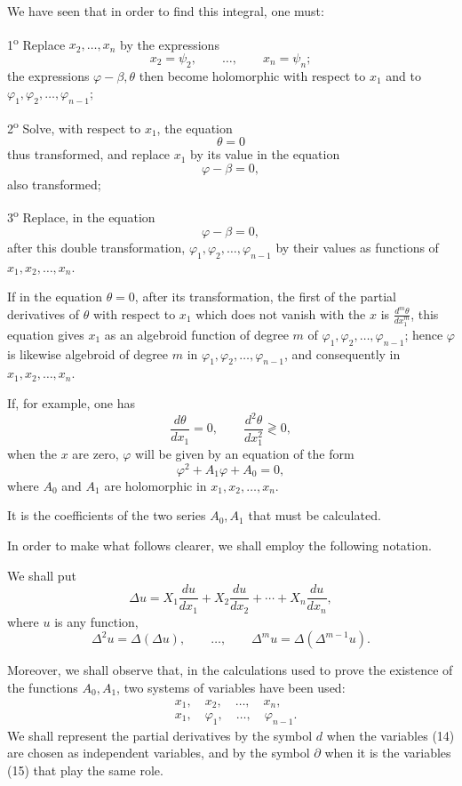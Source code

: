 \documentclass[11pt]{article}
\begin{document}
We have seen that in order to find this integral, one must:

1\textsuperscript{o} Replace $x_2,\ldots,x_n$ by the expressions
\begin{equation*}\tag{6}
x_2=\psi_2,\qquad \ldots,\qquad x_n=\psi_n;
\end{equation*}
the expressions $\varphi-\beta,\theta$ then become holomorphic with respect to $x_1$ and to $\varphi_1,\varphi_2,\ldots,\varphi_{n-1}$;

2\textsuperscript{o} Solve, with respect to $x_1$, the equation
\[
\theta=0
\]
thus transformed, and replace $x_1$ by its value in the equation
\[
\varphi-\beta=0,
\]
also transformed;

3\textsuperscript{o} Replace, in the equation
\[
\varphi-\beta=0,
\]
after this double transformation, $\varphi_1,\varphi_2,\ldots,\varphi_{n-1}$ by their values as functions of $x_1,x_2,\ldots,x_n$.

If in the equation $\theta=0$, after its transformation, the first of the partial derivatives of $\theta$ with respect to $x_1$ which does not vanish with the $x$ is $\frac{d^m\theta}{dx_1^m}$, this equation gives $x_1$ as an algebroid function of degree $m$ of $\varphi_1,\varphi_2,\ldots,\varphi_{n-1}$; hence $\varphi$ is likewise algebroid of degree $m$ in $\varphi_1,\varphi_2,\ldots,\varphi_{n-1}$, and consequently in $x_1,x_2,\ldots,x_n$.

If, for example, one has
\[
\frac{d\theta}{dx_1}=0,\qquad \frac{d^2\theta}{dx_1^2}\gtrless0,
\]
when the $x$ are zero, $\varphi$ will be given by an equation of the form
\[
\varphi^2+A_1\varphi+A_0=0,
\]
where $A_0$ and $A_1$ are holomorphic in $x_1,x_2,\ldots,x_n$.

It is the coefficients of the two series $A_0,A_1$ that must be calculated.

In order to make what follows clearer, we shall employ the following notation.

We shall put
\[
\Delta u=X_1\frac{du}{dx_1}+X_2\frac{du}{dx_2}+\cdots+X_n\frac{du}{dx_n},
\]
where $u$ is any function,
\[
\Delta^2u=\Delta(\Delta u),\qquad \ldots,\qquad \Delta^m u=\Delta(\Delta^{m-1}u).
\]

Moreover, we shall observe that, in the calculations used to prove the existence of the functions $A_0,A_1$, two systems of variables have been used:
\begin{align*}
\tag{14}
&x_1,\quad x_2,\quad \ldots,\quad x_n,\\
\tag{15}
&x_1,\quad \varphi_1,\quad \ldots,\quad \varphi_{n-1}.
\end{align*}
We shall represent the partial derivatives by the symbol $d$ when the variables (14) are chosen as independent variables, and by the symbol $\partial$ when it is the variables (15) that play the same role.
\end{document}
